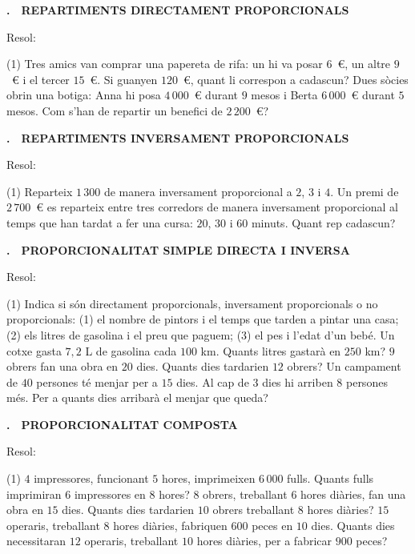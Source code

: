 \documentclass[11pt,a4paper]{article}
\newcounter{exer}
\newcommand{\ex}[2]{\par\needspace{5\baselineskip}\bigskip\stepcounter{exer}\noindent
  {\color{cursfosc}\bfseries\theexer.}\ \ {\scriptsize\bfseries\color{curs}\MakeUppercase{#1}}\par\nopagebreak\smallskip
  \noindent #2\par}
\begin{document}
\ex{Repartiments directament proporcionals}{Resol:}
\begin{tasks}(1)
  \task Tres amics van comprar una papereta de rifa: un hi va posar $6$~€, un altre $9$~€ i el tercer $15$~€. Si guanyen $120$~€, quant li correspon a cadascun?
  \task Dues sòcies obrin una botiga: Anna hi posa $4\,000$~€ durant $9$ mesos i Berta $6\,000$~€ durant $5$ mesos. Com s'han de repartir un benefici de $2\,200$~€?
\end{tasks}

\ex{Repartiments inversament proporcionals}{Resol:}
\begin{tasks}(1)
  \task Reparteix $1\,300$ de manera inversament proporcional a $2$, $3$ i $4$.
  \task Un premi de $2\,700$~€ es reparteix entre tres corredors de manera inversament proporcional al temps que han tardat a fer una cursa: $20$, $30$ i $60$ minuts. Quant rep cadascun?
\end{tasks}

\ex{Proporcionalitat simple directa i inversa}{Resol:}
\begin{tasks}(1)
  \task Indica si són directament proporcionals, inversament proporcionals o no proporcionals: (1) el nombre de pintors i el temps que tarden a pintar una casa; (2) els litres de gasolina i el preu que paguem; (3) el pes i l'edat d'un bebé.
  \task Un cotxe gasta $7,2$ L de gasolina cada $100$ km. Quants litres gastarà en $250$ km?
  \task $9$ obrers fan una obra en $20$ dies. Quants dies tardarien $12$ obrers?
  \task Un campament de $40$ persones té menjar per a $15$ dies. Al cap de $3$ dies hi arriben $8$ persones més. Per a quants dies arribarà el menjar que queda?
\end{tasks}

\ex{Proporcionalitat composta}{Resol:}
\begin{tasks}(1)
  \task $4$ impressores, funcionant $5$ hores, imprimeixen $6\,000$ fulls. Quants fulls imprimiran $6$ impressores en $8$ hores?
  \task $8$ obrers, treballant $6$ hores diàries, fan una obra en $15$ dies. Quants dies tardarien $10$ obrers treballant $8$ hores diàries?
  \task $15$ operaris, treballant $8$ hores diàries, fabriquen $600$ peces en $10$ dies. Quants dies necessitaran $12$ operaris, treballant $10$ hores diàries, per a fabricar $900$ peces?
\end{tasks}
\end{document}
